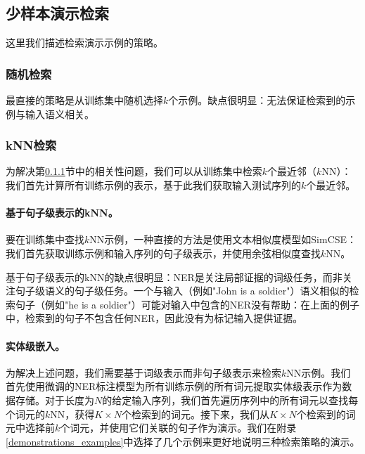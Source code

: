 \documentclass[supercite]{Experimental_Report}
\theoremstyle{definition}
\begin{document}
\subsection{少样本演示检索}
\label{ner_demonstration_retrieval}

这里我们描述检索演示示例的策略。

\subsubsection{随机检索}
\label{random_retrieval}

最直接的策略是从训练集中随机选择$k$个示例。缺点很明显：无法保证检索到的示例与输入语义相关。

\subsubsection{kNN检索}

为解决第\ref{random_retrieval}节中的相关性问题，我们可以从训练集中检索$k$个最近邻（$k$NN）\cite{vilar2022prompting, liu2021makes}：我们首先计算所有训练示例的表示，基于此我们获取输入测试序列的$k$个最近邻。

\paragraph{基于句子级表示的kNN。}
要在训练集中查找$k$NN示例，一种直接的方法是使用文本相似度模型如SimCSE\cite{gao2021simcse}：我们首先获取训练示例和输入序列的句子级表示，并使用余弦相似度查找$k$NN。

基于句子级表示的kNN的缺点很明显：NER是关注局部证据的词级任务，而非关注句子级语义的句子级任务。一个与输入（例如"John is a soldier"）语义相似的检索句子（例如"he is a soldier"）可能对输入中包含的NER没有帮助：在上面的例子中，检索到的句子不包含任何NER，因此没有为标记输入提供证据。

\paragraph{实体级嵌入。}
\label{entity_level_embedding}
为解决上述问题，我们需要基于词级表示而非句子级表示来检索$k$NN示例。我们首先使用微调的NER标注模型为所有训练示例的所有词元提取实体级表示作为数据存储。对于长度为$N$的给定输入序列，我们首先遍历序列中的所有词元以查找每个词元的$k$NN，获得$K\times N$个检索到的词元。接下来，我们从$K\times N$个检索到的词元中选择前$k$个词元，并使用它们关联的句子作为演示。我们在附录\ref{demonstrations_examples}中选择了几个示例来更好地说明三种检索策略的演示。
\end{document}
